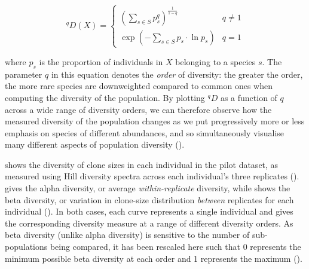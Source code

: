 \begin{equation}
^qD(X) = \begin{cases} \left(\displaystyle\sum_{s \in S} p_s^q \right)^{\frac{1}{1-q}} & q \neq 1\\
\exp\left(-\displaystyle\sum_{s \in S}p_s \cdot \ln p_s\right) & q = 1 \end{cases}
\end{equation}

\noindent where $p_s$ is the proportion of individuals in $X$ belonging to a species $s$. The parameter $q$ in this equation denotes the \textit{order} of diversity: the greater the order, the more rare species are downweighted compared to common ones when computing the diversity of the population. By plotting $^qD$ as a function of $q$ across a wide range of diversity orders, we can therefore observe how the measured diversity of the population changes as we put progressively more or less emphasis on species of different abundances, and so simultaneously visualise many different aspects of population diversity ().

 shows the diversity of clone sizes in each individual in the pilot dataset, as measured using Hill diversity spectra across each individual's three replicates ().  gives the alpha diversity, or average \textit{within-replicate} diversity, while  shows the beta diversity, or variation in clone-size distribution \textit{between} replicates for each individual (). In both cases, each curve represents a single individual and gives the corresponding diversity measure at a range of different diversity orders. As beta diversity (unlike alpha diversity) is sensitive to the number of sub-populations being compared, it has been rescaled here such that 0 represents the minimum possible beta diversity at each order and 1 represents the maximum ().

